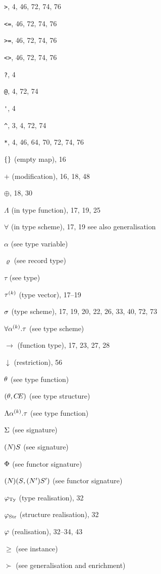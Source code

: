 \begin{theindex}
\item \verb+>+, 4, 46, 72, 74, 76
\item \verb+<=+, 46, 72, 74, 76
\item \verb+>=+, 46, 72, 74, 76
\item \verb+<>+, 46, 72, 74, 76
\item \verb+?+, 4
\item \verb+@+, 4, 72, 74
\item \verb+'+, 4
\item \verb+^+, 3, 4, 72, 74
\item \verb+*+, 4, 46, 64, 70, 72, 74, 76
\item $\{\}$ (empty map), 16
\item $+$ (modification), 16, 18, 48
\item $\oplus$, 18, 30
\item $\Lambda$ (in type function), 17, 19, 25
\item $\forall$ (in type scheme), 17, 19
\subitem see also generalisation 
\item $\alpha$ (see type variable) 
\item $\varrho$ (see record type) 
\item $\tau$ (see type) 
\item $\mbox{$\tau^{(k)}$}$ (type vector), 17--19
\item $\sigma$ (type scheme), 17, 19, 20, 22, 26, 33, 40, 72, 73
\item $\forall\mbox{$\alpha^{(k)}$}.\tau$ (see type scheme) 
\item $\rightarrow$ (function type), 17, 23, 27, 28
\item $\downarrow$ (restriction), 56
\item $\theta$ (see type function) 
\item $(\theta,\mbox{$C\!E$})$ (see type structure) 
\item $\Lambda\mbox{$\alpha^{(k)}$}.\tau$ (see type function) 
\item $\Sigma$ (see signature) 
\item $(N_{})S_{}$ (see signature) 
\item $\Phi$ (see functor signature) 
\item $(N_{})(S_{},(N_{}')S_{} ')$ (see functor signature) 
\item $\varphi_{\rm Ty}$ (type realisation), 32
\item $\varphi_{\rm Str}$ (structure realisation), 32
\item $\varphi$ (realisation), 32--34, 43
\item $\geq$ (see instance) 
\item $\succ$ (see generalisation and enrichment) 

\end{theindex}
